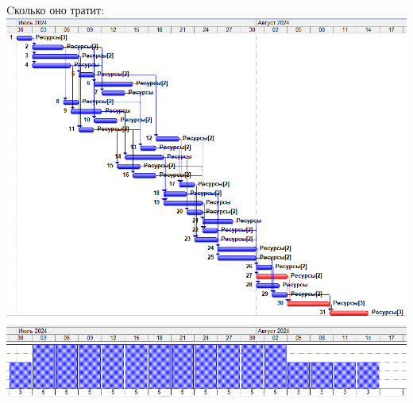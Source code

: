 \documentclass[14pt]{article}
\begin{document}
		{\LARGE Cколько оно тратит:}\\
		\includegraphics[width=\textwidth]{../img/2b2_answer.png}\\ 
\end{document}
